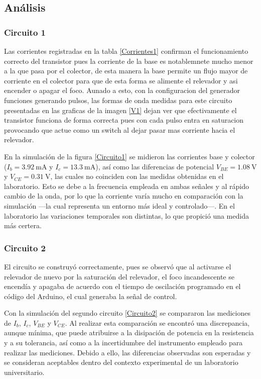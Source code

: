 \subsection{Análisis}
\noindent 

\subsubsection{Circuito 1}
Las corrientes registradas en la tabla \ref{Corrientes1} confirman el funcionamiento correcto del transistor pues la corriente de la base es notablemnete mucho menor a la que pasa por el colector, de esta manera la base permite un flujo mayor de corriente en el colector para que de esta forma se alimente el relevador y asi encender o apagar el foco. Aunado a esto, con la configuracion del generador funciones generando pulsos, las formas de onda medidas para este circuito presentadas en las graficas de la imagen \ref{V1} dejan ver que efectivamente el transistor funciona de forma correcta pues con cada pulso entra en saturacion provocando que actue como un switch al dejar pasar mas corriente hacia el relevador. 


En la simulación de la figura \ref{Circuito1} se midieron las corrientes base y colector ($I_b = 3.92\ \mathrm{mA}$ y $I_c = 13.3\ \mathrm{mA}$), así como las diferencias de potencial $V_{BE} = 1.08\ \mathrm{V}$ y $V_{CE} = 0.31\ \mathrm{V}$, las cuales no coinciden con las medidas obtenidas en el laboratorio. Esto se debe a la frecuencia empleada en ambas señales y al rápido cambio de la onda, por lo que la corriente varía mucho en comparación con la simulación —la cual representa un entorno más ideal y controlado—. En el laboratorio las variaciones temporales son distintas, lo que propició una medida más certera.

\subsubsection{Circuito 2}
El circuito se construyó correctamente, pues se observó que al activarse el relevador de nuevo por la saturación del relevador, el foco incandescente se encendía y apagaba de acuerdo con el tiempo de oscilación programado en el código del Arduino, el cual generaba la señal de control.

Con la simulación del segundo circuito \ref{Circuito2} se compararon las mediciones de $I_b$, $I_c$, $V_{BE}$ y $V_{CE}$. Al realizar esta comparación se encontró una discrepancia, aunque mínima, que puede atribuirse a la disipación de potencia en la resistencia y a su tolerancia, así como a la incertidumbre del instrumento empleado para realizar las mediciones. Debido a ello, las diferencias observadas son esperadas y se consideran aceptables dentro del contexto experimental de un laboratorio universitario.


